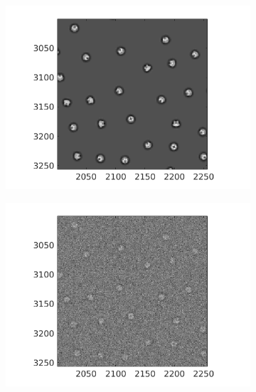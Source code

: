 \documentclass[12pt]{article}
\newcommand{\1}{\mathbf{1}}
\theoremstyle{plain}
\theoremstyle{definition}
\theoremstyle{remark}
\theoremstyle{plain}
\theoremstyle{remark}
\theoremstyle{plain}
\theoremstyle{plain}
\begin{document}
\begin{figure}[t!]
	\centering
	\begin{subfigure}[t]{0.245\textwidth}
		\centering
		\includegraphics[scale=0.3]{TRPV1_clean_micro.png}
		\caption{}
	\end{subfigure} \hfill %
	\begin{subfigure}[t]{0.245\textwidth}
		\centering
		\includegraphics[scale=0.3]{TRPV1_noisy_micro_SNR_16.png}
		\caption{}
	\end{subfigure} \hfill %
	\begin{subfigure}[t]{0.245\textwidth}
		\centering

\end{subfigure}
\end{figure}
\end{document}
